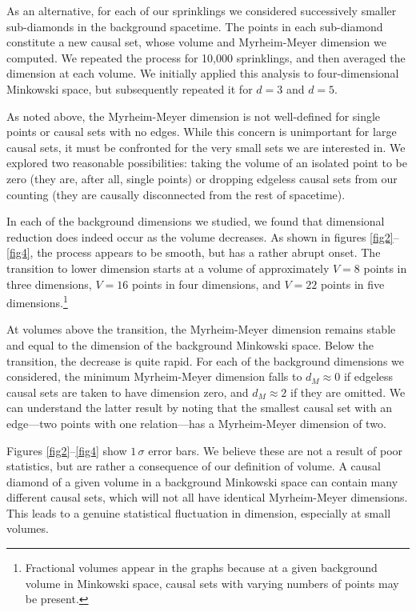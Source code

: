 \documentclass[12pt]{article}
\makeatletter
\def\section{\@startsection{section}{1}{\z@}{3.5ex plus 1ex minus
   .2ex}{2.3ex plus .2ex}{\large\bf}}
\makeatother
\begin{document}
As an alternative, for each of our sprinklings we considered successively smaller sub-diamonds
in the background spacetime.  The points in each sub-diamond constitute a new causal
set, whose volume and Myrheim-Meyer dimension we computed.  We repeated the
process for 10,000 sprinklings, and then averaged the dimension at
each volume.  We initially applied this analysis to four-dimensional Minkowski space,
but subsequently repeated it for $d=3$ and $d=5$.

As noted above, the Myrheim-Meyer dimension is not well-defined for single points or
causal sets with no edges.  While this concern is unimportant for large causal sets, it
must be confronted for the very small sets  we are interested in.  We explored
two reasonable possibilities: taking the volume of an isolated point to be zero (they are,
after all, single points) or dropping edgeless causal sets from our counting (they
are causally disconnected from the rest of spacetime).

\section{Results}

In each of the background dimensions we studied, we found that dimensional reduction
does indeed occur as the volume decreases.   As shown in figures \ref{fig2}--\ref{fig4},
the process appears to be smooth, but has a rather abrupt onset.  The
transition to lower dimension starts at a volume of approximately $V=8$ points in
three dimensions, $V=16$ points in four dimensions, and $V=22$ points in five
dimensions.\footnote{Fractional volumes appear in the graphs because at a given
background volume in Minkowski space, causal sets with varying numbers of points
may be present.}

At volumes above the transition, the Myrheim-Meyer dimension remains stable and
equal to the dimension of the background Minkowski space.  Below the transition,
the decrease is quite rapid.  For each of the background dimensions we considered,
the minimum Myrheim-Meyer dimension falls to $d_M\approx 0$ if edgeless causal
sets are taken to have dimension zero, and $d_M\approx 2$ if they are omitted.
We can understand the latter result by noting that the smallest causal set with an
edge---two points with one relation---has a Myrheim-Meyer dimension of two.

Figures \ref{fig2}--\ref{fig4} show $1\, \sigma$ error bars.  We believe these are not
a result of poor statistics, but are rather a consequence of our definition of
volume.  A causal diamond of a given volume in a background Minkowski space can
contain many different causal sets, which will not all have identical Myrheim-Meyer
dimensions.  This leads to a genuine statistical fluctuation in dimension, especially
at small volumes.
\end{document}
